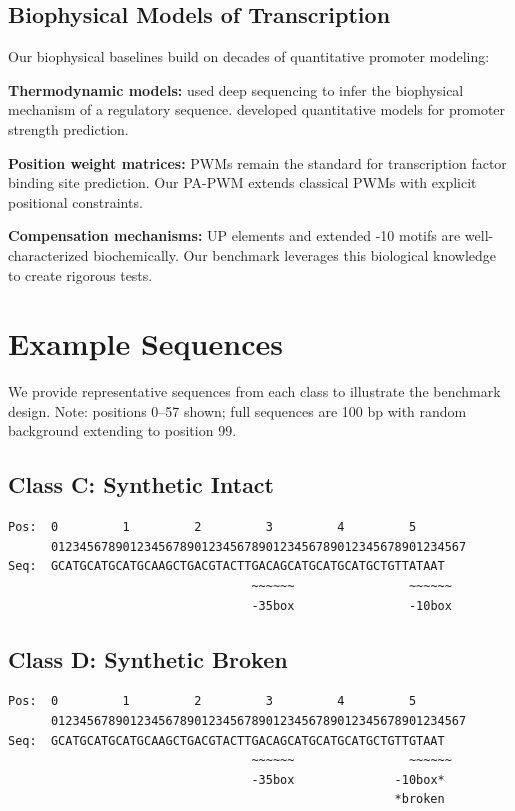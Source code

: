 \documentclass{article}
\begin{document}
\subsection{Biophysical Models of Transcription}

Our biophysical baselines build on decades of quantitative promoter modeling:

\textbf{Thermodynamic models:} \citet{kinney2010using} used deep sequencing to infer the biophysical mechanism of a regulatory sequence. \citet{brewster2012lac} developed quantitative models for promoter strength prediction.

\textbf{Position weight matrices:} PWMs remain the standard for transcription factor binding site prediction. Our PA-PWM extends classical PWMs with explicit positional constraints.

\textbf{Compensation mechanisms:} UP elements \citep{ross1993third} and extended -10 motifs \citep{barne1997region} are well-characterized biochemically. Our benchmark leverages this biological knowledge to create rigorous tests.

\section{Example Sequences}
\label{app:examples}

We provide representative sequences from each class to illustrate the benchmark design. Note: positions 0--57 shown; full sequences are 100 bp with random background extending to position 99.

\subsection{Class C: Synthetic Intact}
{\small
\begin{verbatim}
Pos:  0         1         2         3         4         5
      0123456789012345678901234567890123456789012345678901234567
Seq:  GCATGCATGCATGCAAGCTGACGTACTTGACAGCATGCATGCATGCTGTTATAAT
                                  ~~~~~~                ~~~~~~
                                  -35box                -10box
\end{verbatim}
}

\subsection{Class D: Synthetic Broken}
{\small
\begin{verbatim}
Pos:  0         1         2         3         4         5
      0123456789012345678901234567890123456789012345678901234567
Seq:  GCATGCATGCATGCAAGCTGACGTACTTGACAGCATGCATGCATGCTGTTGTAAT
                                  ~~~~~~                ~~~~~~
                                  -35box              -10box*
                                                      *broken
\end{verbatim}
}
\end{document}

